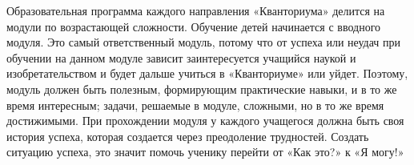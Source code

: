 Образовательная программа каждого направления «Кванториума» делится на модули по
возрастающей сложности. Обучение детей начинается с вводного модуля. Это самый
ответственный модуль, потому что от успеха или неудач при обучении на данном
модуле зависит заинтересуется учащийся наукой и изобретательством и будет дальше
учиться в «Кванториуме» или уйдет. Поэтому, модуль должен быть полезным,
формирующим практические навыки, и в то же время интересным; задачи, решаемые в
модуле, сложными, но в то же время достижимыми. При прохождении модуля у каждого
учащегося должна быть своя история успеха, которая создается через преодоление
трудностей. Создать ситуацию успеха, это значит помочь ученику перейти от «Как
это?» к «Я могу!»
